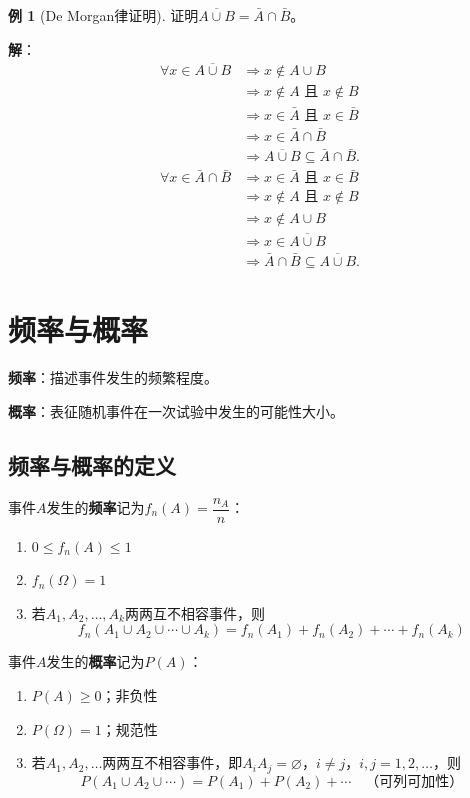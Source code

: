 \documentclass[11pt,a4paper]{report}
\theoremstyle{definition}
\newtheorem{example}{例}[chapter]
\theoremstyle{plain}
\begin{document}
\begin{example}[De Morgan律证明]
证明$\overline{A\cup B}=\bar{A}\cap\bar{B}$。

\textbf{解}：
\[
\begin{aligned}
\forall x\in\overline{A\cup B}&\Rightarrow x\not\in A\cup B\\
&\Rightarrow x\not\in A\text{ 且 }x\not\in B\\
&\Rightarrow x\in\bar{A}\text{ 且 }x\in\bar{B}\\
&\Rightarrow x\in\bar{A}\cap\bar{B}\\
&\Rightarrow\overline{A\cup B}\subseteq\bar{A}\cap\bar{B}.
\end{aligned}
\]
\[
\begin{aligned}
\forall x\in\bar{A}\cap\bar{B}&\Rightarrow x\in\bar{A}\text{ 且 }x\in\bar{B}\\
&\Rightarrow x\not\in A\text{ 且 }x\not\in B\\
&\Rightarrow x\not\in A\cup B\\
&\Rightarrow x\in\overline{A\cup B}\\
&\Rightarrow\bar{A}\cap\bar{B}\subseteq\overline{A\cup B}.
\end{aligned}
\]
\end{example}

\section{频率与概率}

\textbf{频率}：描述事件发生的频繁程度。

\textbf{概率}：表征随机事件在一次试验中发生的可能性大小。

\subsection{频率与概率的定义}

事件$A$发生的\textbf{频率}记为$f_n(A)=\dfrac{n_A}{n}$：
\begin{enumerate}[label=\arabic*.,leftmargin=2em]
    \item $0\leq f_n(A)\leq1$
    \item $f_n(\Omega)=1$
    \item 若$A_1,A_2,\ldots,A_k$两两互不相容事件，则
    \[
    f_n(A_1\cup A_2\cup\cdots\cup A_k)=f_n(A_1)+f_n(A_2)+\cdots+f_n(A_k)
    \]
\end{enumerate}

事件$A$发生的\textbf{概率}记为$P(A)$：
\begin{enumerate}[label=\arabic*.,leftmargin=2em]
    \item $P(A)\geq0$；非负性
    \item $P(\Omega)=1$；规范性
    \item 若$A_1,A_2,\ldots$两两互不相容事件，即$A_iA_j=\varnothing$，$i\neq j$，$i,j=1,2,\ldots$，则
    \[
    P(A_1\cup A_2\cup\cdots)=P(A_1)+P(A_2)+\cdots\quad\text{（可列可加性）}
    \]
\end{enumerate}
\end{document}

